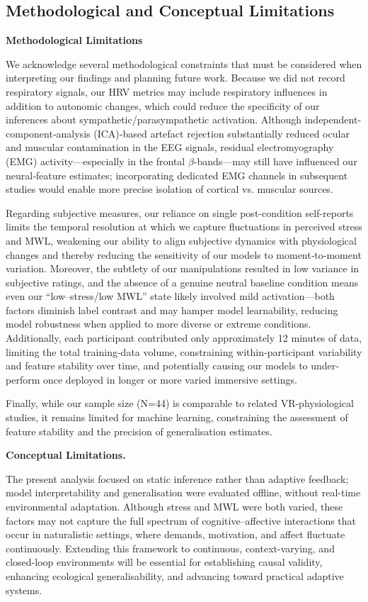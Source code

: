 \documentclass[lettersize,journal]{IEEEtran}
\begin{document}
\subsection{Methodological and Conceptual Limitations}

\textbf{Methodological Limitations}

We acknowledge several methodological constraints that must be considered when interpreting our findings and planning future work. Because we did not record respiratory signals, our HRV metrics may include respiratory influences in addition to autonomic changes, which could reduce the specificity of our inferences about sympathetic/parasympathetic activation. Although independent‐component‐analysis (ICA)‐based artefact rejection substantially reduced ocular and muscular contamination in the EEG signals, residual electromyography (EMG) activity—especially in the frontal \(\beta\)-bands—may still have influenced our neural‐feature estimates; incorporating dedicated EMG channels in subsequent studies would enable more precise isolation of cortical vs. muscular sources. 

Regarding subjective measures, our reliance on single post-condition self-reports limits the temporal resolution at which we capture fluctuations in perceived stress and MWL, weakening our ability to align subjective dynamics with physiological changes and thereby reducing the sensitivity of our models to moment‐to‐moment variation. Moreover, the subtlety of our manipulations resulted in low variance in subjective ratings, and the absence of a genuine neutral baseline condition means even our “low–stress/low MWL” state likely involved mild activation—both factors diminish label contrast and may hamper model learnability, reducing model robustness when applied to more diverse or extreme conditions.  Additionally, each participant contributed only approximately 12 minutes of data, limiting the total training‐data volume, constraining within‐participant variability and feature stability over time, and potentially causing our models to under‐perform once deployed in longer or more varied immersive settings.

Finally, while our sample size (N=44) is comparable to related VR-physiological studies, it remains limited for machine learning, constraining the assessment of feature stability and the precision of generalisation estimates.


\textbf{Conceptual Limitations.} 

The present analysis focused on static inference rather than adaptive feedback; model interpretability and generalisation were evaluated offline, without real-time environmental adaptation. 
Although stress and MWL were both varied, these factors may not capture the full spectrum of cognitive–affective interactions that occur in naturalistic settings, where demands, motivation, and affect fluctuate continuously. 
Extending this framework to continuous, context-varying, and closed-loop environments will be essential for establishing causal validity, enhancing ecological generalisability, and advancing toward practical adaptive systems.
\end{document}
